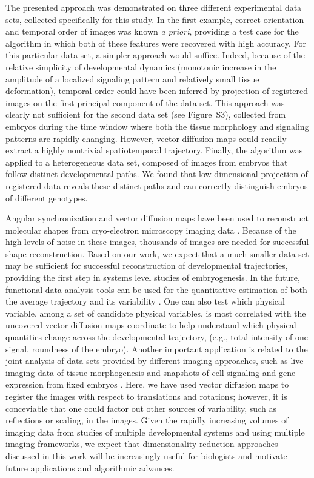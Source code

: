 \documentclass{pnastwo}
\begin{document}
\begin{article}
The presented approach was demonstrated on three different experimental data sets, collected specifically for this study. 
%
In the first example, correct orientation and temporal order of images was known {\it a priori}, providing a test case for the algorithm in which both of these features were recovered with high accuracy. 
%
For this particular data set, a simpler approach would suffice. 
%
Indeed, because of the relative simplicity of developmental dynamics (monotonic increase in the amplitude of a localized signaling pattern and relatively small tissue deformation), temporal order could have been inferred by projection of registered images on the first principal component of the data set. 
%
This approach was clearly not sufficient for the second data set (see Figure~S3), collected from embryos during the time window where both the tissue morphology and signaling patterns are rapidly changing.  
%
However, vector diffusion maps could readily extract a highly nontrivial spatiotemporal trajectory. 
%
Finally, the algorithm was applied to a heterogeneous data set, composed of images from embryos that follow distinct developmental paths. 
%
We found that low-dimensional projection of registered data reveals these distinct paths and can correctly distinguish embryos of different genotypes. 

Angular synchronization and vector diffusion maps have been used to reconstruct molecular shapes from cryo-electron microscopy imaging data \cite{singer2012vector, singer2011three}. 
%
Because of the high levels of noise in these images, thousands of images are needed for successful shape reconstruction. 
%
Based on our work, we expect that a much smaller data set may be sufficient for successful reconstruction of developmental trajectories, providing the first step in systems level studies of embryogenesis. 
%
In the future, functional data analysis tools can be used for the quantitative estimation of both the average trajectory and its variability \cite{silverman2005functional}.  
%
One can also test which physical variable, among a set of candidate physical variables, is most correlated with the uncovered vector diffusion maps coordinate to help understand which physical quantities change across the developmental trajectory, (e.g., total intensity of one signal, roundness of the embryo).
%
Another important application is related to the joint analysis of data sets provided by different imaging approaches, such as live imaging data of tissue morphogenesis and snapshots of cell signaling and gene expression from fixed embryos \cite{krzic2012multiview, ichikawa2014live, rubel2010coupling}. 
%
Here, we have used vector diffusion maps to register the images with respect to translations and rotations; however, it is conceviable that one could factor out other sources of variability, such as reflections or scaling, in the images.
%
Given the rapidly increasing volumes of imaging data from studies of multiple developmental systems and using multiple imaging frameworks, we expect that dimensionality reduction approaches discussed in this work will be increasingly useful for biologists and motivate future applications and algorithmic advances. 
  


\end{article}
\end{document}
